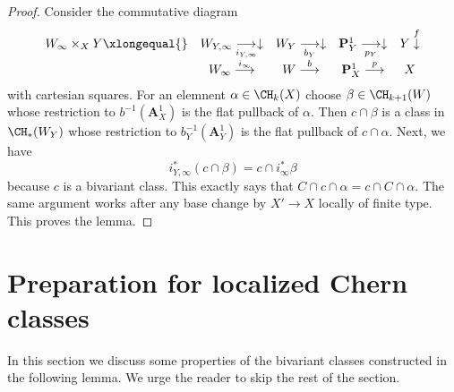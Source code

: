 \begin{proof}
Consider the commutative diagram
$$
\begin{array}{ccccc}W_\infty \times_X Y \xlongequal{} & W_{Y, \infty} \underset{i_{Y, \infty}}{\longrightarrow}\downarrow & W_Y \underset{b_Y}{\longrightarrow}\downarrow & \mathbf{P}^1_Y \underset{p_Y}{\longrightarrow}\downarrow & Y \overset{f}{\downarrow} \\  & W_\infty \overset{i_\infty}{\longrightarrow} & W \overset{b}{\longrightarrow} & \mathbf{P}^1_X \overset{p}{\longrightarrow} & X\end{array}
$$
with cartesian squares. For an elemnent $\alpha \in \CH_k(X)$
choose $\beta \in \CH_{k + 1}(W)$ whose restriction to $b^{-1}(\mathbf{A}^1_X)$
is the flat pullback of $\alpha$. Then $c \cap \beta$ is a class
in $\CH_*(W_Y)$ whose restriction to $b_Y^{-1}(\mathbf{A}^1_Y)$
is the flat pullback of $c \cap \alpha$. Next, we have
$$
i_{Y, \infty}^*(c \cap \beta) = c \cap i_\infty^*\beta
$$
because $c$ is a bivariant class. This exactly says that
$C \cap c \cap \alpha = c \cap C \cap \alpha$. The same argument
works after any base change by $X' \to X$ locally of finite type.
This proves the lemma.
\end{proof}

\section{Preparation for localized Chern classes}
\label{chow-section-preparation-localized-chern-II}
In this section we discuss some properties of the bivariant classes
constructed in the following lemma. We urge the
reader to skip the rest of the section.

